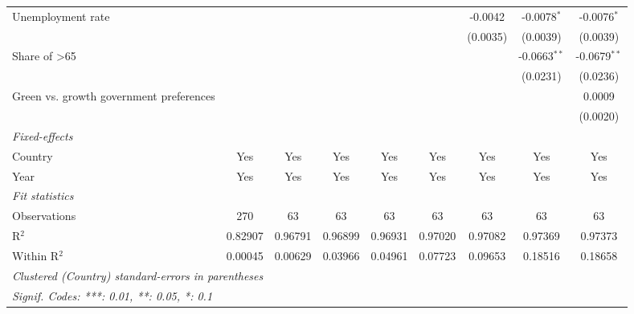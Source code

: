 \begin{table}[htbp]
\begin{tabular}{lcccccccc}
      Unemployment rate                                         &          &          &          &          &          & -0.0042  & -0.0078$^{*}$  & -0.0076$^{*}$\\   
                                                                &          &          &          &          &          & (0.0035) & (0.0039)       & (0.0039)\\   
      Share of >65                                              &          &          &          &          &          &          & -0.0663$^{**}$ & -0.0679$^{**}$\\   
                                                                &          &          &          &          &          &          & (0.0231)       & (0.0236)\\   
      Green vs. growth government preferences                   &          &          &          &          &          &          &                & 0.0009\\   
                                                                &          &          &          &          &          &          &                & (0.0020)\\   
      \midrule
      \emph{Fixed-effects}\\
      Country                                                   & Yes      & Yes      & Yes      & Yes      & Yes      & Yes      & Yes            & Yes\\  
      Year                                                      & Yes      & Yes      & Yes      & Yes      & Yes      & Yes      & Yes            & Yes\\  
      \midrule
      \emph{Fit statistics}\\
      Observations                                              & 270      & 63       & 63       & 63       & 63       & 63       & 63             & 63\\  
      R$^2$                                                     & 0.82907  & 0.96791  & 0.96899  & 0.96931  & 0.97020  & 0.97082  & 0.97369        & 0.97373\\  
      Within R$^2$                                              & 0.00045  & 0.00629  & 0.03966  & 0.04961  & 0.07723  & 0.09653  & 0.18516        & 0.18658\\  
      \midrule \midrule
      \multicolumn{9}{l}{\emph{Clustered (Country) standard-errors in parentheses}}\\
      \multicolumn{9}{l}{\emph{Signif. Codes: ***: 0.01, **: 0.05, *: 0.1}}\\
   \end{tabular}
\end{table}



